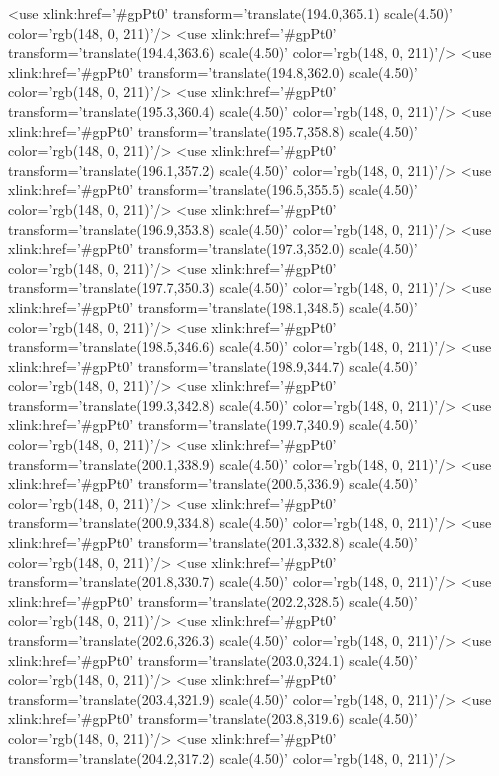 	<use xlink:href='#gpPt0' transform='translate(194.0,365.1) scale(4.50)' color='rgb(148,   0, 211)'/>
	<use xlink:href='#gpPt0' transform='translate(194.4,363.6) scale(4.50)' color='rgb(148,   0, 211)'/>
	<use xlink:href='#gpPt0' transform='translate(194.8,362.0) scale(4.50)' color='rgb(148,   0, 211)'/>
	<use xlink:href='#gpPt0' transform='translate(195.3,360.4) scale(4.50)' color='rgb(148,   0, 211)'/>
	<use xlink:href='#gpPt0' transform='translate(195.7,358.8) scale(4.50)' color='rgb(148,   0, 211)'/>
	<use xlink:href='#gpPt0' transform='translate(196.1,357.2) scale(4.50)' color='rgb(148,   0, 211)'/>
	<use xlink:href='#gpPt0' transform='translate(196.5,355.5) scale(4.50)' color='rgb(148,   0, 211)'/>
	<use xlink:href='#gpPt0' transform='translate(196.9,353.8) scale(4.50)' color='rgb(148,   0, 211)'/>
	<use xlink:href='#gpPt0' transform='translate(197.3,352.0) scale(4.50)' color='rgb(148,   0, 211)'/>
	<use xlink:href='#gpPt0' transform='translate(197.7,350.3) scale(4.50)' color='rgb(148,   0, 211)'/>
	<use xlink:href='#gpPt0' transform='translate(198.1,348.5) scale(4.50)' color='rgb(148,   0, 211)'/>
	<use xlink:href='#gpPt0' transform='translate(198.5,346.6) scale(4.50)' color='rgb(148,   0, 211)'/>
	<use xlink:href='#gpPt0' transform='translate(198.9,344.7) scale(4.50)' color='rgb(148,   0, 211)'/>
	<use xlink:href='#gpPt0' transform='translate(199.3,342.8) scale(4.50)' color='rgb(148,   0, 211)'/>
	<use xlink:href='#gpPt0' transform='translate(199.7,340.9) scale(4.50)' color='rgb(148,   0, 211)'/>
	<use xlink:href='#gpPt0' transform='translate(200.1,338.9) scale(4.50)' color='rgb(148,   0, 211)'/>
	<use xlink:href='#gpPt0' transform='translate(200.5,336.9) scale(4.50)' color='rgb(148,   0, 211)'/>
	<use xlink:href='#gpPt0' transform='translate(200.9,334.8) scale(4.50)' color='rgb(148,   0, 211)'/>
	<use xlink:href='#gpPt0' transform='translate(201.3,332.8) scale(4.50)' color='rgb(148,   0, 211)'/>
	<use xlink:href='#gpPt0' transform='translate(201.8,330.7) scale(4.50)' color='rgb(148,   0, 211)'/>
	<use xlink:href='#gpPt0' transform='translate(202.2,328.5) scale(4.50)' color='rgb(148,   0, 211)'/>
	<use xlink:href='#gpPt0' transform='translate(202.6,326.3) scale(4.50)' color='rgb(148,   0, 211)'/>
	<use xlink:href='#gpPt0' transform='translate(203.0,324.1) scale(4.50)' color='rgb(148,   0, 211)'/>
	<use xlink:href='#gpPt0' transform='translate(203.4,321.9) scale(4.50)' color='rgb(148,   0, 211)'/>
	<use xlink:href='#gpPt0' transform='translate(203.8,319.6) scale(4.50)' color='rgb(148,   0, 211)'/>
	<use xlink:href='#gpPt0' transform='translate(204.2,317.2) scale(4.50)' color='rgb(148,   0, 211)'/>
